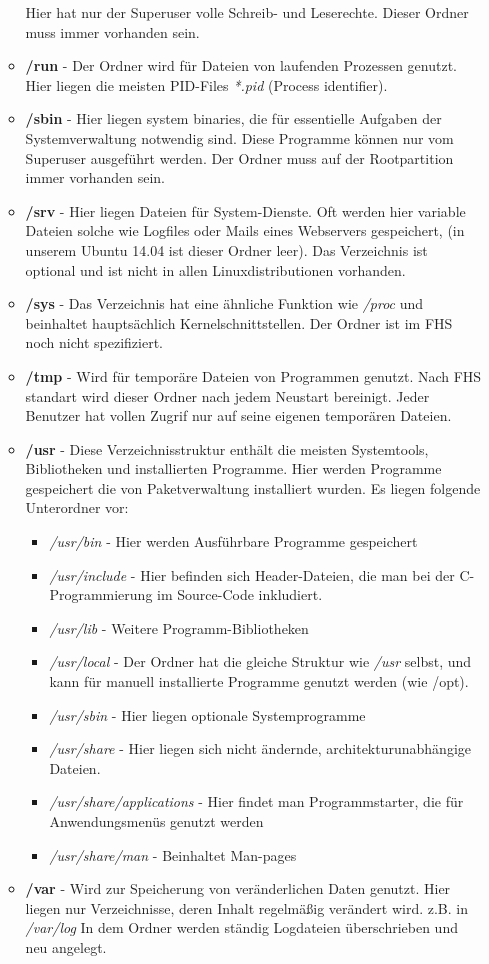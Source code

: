 \begin{itemize}
\begin{itemize}
			Hier hat nur der Superuser volle Schreib- und Leserechte.
			Dieser Ordner muss immer vorhanden sein.
			\item \textbf{/run} - Der Ordner wird für Dateien von laufenden Prozessen genutzt.
			Hier liegen die meisten PID-Files \textit{*.pid} (Process identifier).
			\item \textbf{/sbin } - Hier liegen system binaries, die für essentielle Aufgaben der Systemverwaltung
			notwendig sind. Diese Programme können nur vom Superuser ausgeführt werden.
			Der Ordner muss auf der Rootpartition immer vorhanden sein.
			\item \textbf{/srv }- Hier liegen Dateien für System-Dienste.
			Oft werden hier variable Dateien solche wie Logfiles oder Mails eines Webservers gespeichert,
			(in unserem Ubuntu 14.04 ist dieser Ordner leer).
			Das Verzeichnis ist optional und ist nicht in allen Linuxdistributionen vorhanden.
			\item \textbf{/sys} - Das Verzeichnis hat eine ähnliche Funktion wie \textit{/proc} und beinhaltet
 			hauptsächlich Kernelschnittstellen.
		  Der Ordner ist im FHS noch nicht spezifiziert.
			\item \textbf{/tmp} - Wird für temporäre Dateien von Programmen genutzt.
			Nach FHS standart wird dieser Ordner nach jedem Neustart bereinigt.
			Jeder Benutzer hat vollen Zugrif nur auf seine eigenen temporären Dateien.
			\item \textbf{/usr} - Diese Verzeichnisstruktur enthält die meisten Systemtools, Bibliotheken und installierten Programme.
			Hier werden Programme gespeichert die von Paketverwaltung installiert wurden.
			Es liegen folgende Unterordner vor:
			\begin{itemize}
				\item \textit{/usr/bin} - Hier werden Ausführbare Programme gespeichert
				\item \textit{/usr/include} - Hier befinden sich Header-Dateien, die man bei der C-Programmierung
				im Source-Code inkludiert.
				\item \textit{/usr/lib} - Weitere Programm-Bibliotheken
				\item \textit{/usr/local} - Der Ordner hat die gleiche Struktur wie \textit{/usr} selbst, und kann
				für manuell installierte Programme genutzt werden (wie /opt).
				\item \textit{/usr/sbin} - Hier liegen optionale Systemprogramme
				\item \textit{/usr/share} - Hier liegen sich nicht ändernde, architekturunabhängige Dateien.
				\item \textit{/usr/share/applications} - Hier findet man Programmstarter, die für Anwendungsmenüs genutzt werden
				\item \textit{/usr/share/man} - Beinhaltet Man-pages
			\end{itemize}
			\item \textbf{/var } - Wird zur Speicherung von veränderlichen Daten genutzt. Hier liegen nur Verzeichnisse,
			deren Inhalt regelmäßig verändert wird.
			z.B. in \textit{/var/log} In dem Ordner werden ständig Logdateien überschrieben und neu angelegt.



\end{itemize}
\end{itemize}
